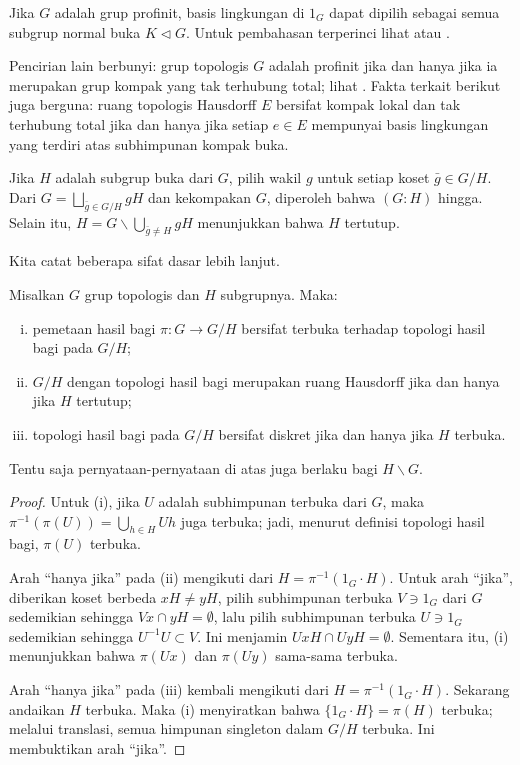 Jika $G$ adalah grup profinit, basis lingkungan di $1_G$ dapat dipilih sebagai semua subgrup normal buka $K \lhd G$. Untuk pembahasan terperinci lihat \cite[\S 1.9]{FL14} atau \cite[\S 4.10]{Li1}.

\begin{remark}
	Pencirian lain berbunyi: grup topologis $G$ adalah profinit jika dan hanya jika ia merupakan grup kompak yang tak terhubung total; lihat \cite[\S 1.7 dan Proposisi 1.9.3]{FL14}. Fakta terkait berikut juga berguna: ruang topologis Hausdorff $E$ bersifat kompak lokal dan tak terhubung total jika dan hanya jika setiap $e \in E$ mempunyai basis lingkungan yang terdiri atas subhimpunan kompak buka.
\end{remark}

Jika $H$ adalah subgrup buka dari $G$, pilih wakil $g$ untuk setiap koset
$\bar{g} \in G/H$. Dari
$G = \bigsqcup_{\bar{g} \in G/H} gH$ dan kekompakan $G$, diperoleh bahwa
$(G:H)$ hingga. Selain itu,
$H = G \smallsetminus \bigcup_{\bar{g} \neq H} gH$ menunjukkan bahwa $H$
tertutup.

Kita catat beberapa sifat dasar lebih lanjut.

\begin{lemma}
	Misalkan $G$ grup topologis dan $H$ subgrupnya. Maka:
	\begin{enumerate}[(i)]
		\item pemetaan hasil bagi $\pi: G \to G/H$ bersifat terbuka terhadap topologi hasil bagi pada $G/H$;
		\item $G/H$ dengan topologi hasil bagi merupakan ruang Hausdorff jika dan hanya jika $H$ tertutup;
		\item topologi hasil bagi pada $G/H$ bersifat diskret jika dan hanya jika $H$ terbuka.
	\end{enumerate}
	Tentu saja pernyataan-pernyataan di atas juga berlaku bagi $H \backslash G$.
\end{lemma}
\begin{proof}
	Untuk (i), jika $U$ adalah subhimpunan terbuka dari $G$, maka $\pi^{-1}(\pi(U)) = \bigcup_{h \in H} Uh$ juga terbuka; jadi, menurut definisi topologi hasil bagi, $\pi(U)$ terbuka.
	
	Arah ``hanya jika'' pada (ii) mengikuti dari $H = \pi^{-1}(1_G \cdot H)$. Untuk arah ``jika'', diberikan koset berbeda $xH \neq yH$, pilih subhimpunan terbuka $V \ni 1_G$ dari $G$ sedemikian sehingga $Vx \cap yH = \emptyset$, lalu pilih subhimpunan terbuka $U \ni 1_G$ sedemikian sehingga $U^{-1} U \subset V$. Ini menjamin $UxH \cap UyH = \emptyset$. Sementara itu, (i) menunjukkan bahwa $\pi(Ux)$ dan $\pi(Uy)$ sama-sama terbuka.
	
	Arah ``hanya jika'' pada (iii) kembali mengikuti dari $H = \pi^{-1}(1_G \cdot H)$. Sekarang andaikan $H$ terbuka. Maka (i) menyiratkan bahwa $\{1_G \cdot H\} = \pi(H)$ terbuka; melalui translasi, semua himpunan singleton dalam $G/H$ terbuka. Ini membuktikan arah ``jika''.
\end{proof}

